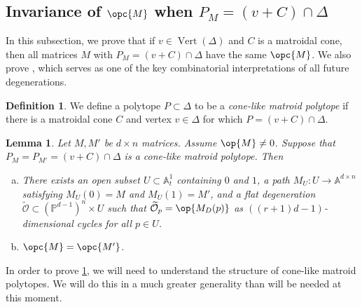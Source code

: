 \documentclass[12pt]{amsart}
\newcommand{\mb}{\mathbb}
\newcommand{\mc}{\mathcal}
\newcommand{\wt}{\widetilde}
\newcommand{\Vt}{{\operatorname{Vert}}}
\theoremstyle{plain}
\newtheorem{Lem}[Thm]{Lemma}
\theoremstyle{definition}
\newtheorem{Def}{Definition}[section]
\theoremstyle{remark}
\begin{document}

\subsection{Invariance of $\opc{M}$ when $P_M=(v+C)\cap \Delta$}
In this subsection, we prove that if $v \in \Vt(\Delta)$ and $C$ is a matroidal cone, then all matrices $M$ with $P_M=(v+C)\cap \Delta$ have the same $\opc{M}$. We also prove , which serves as one of the key combinatorial interpretations of all future degenerations.

\begin{Def}
\label{conelike}
We define a polytope $P \subset \Delta$ to be a \emph{cone-like matroid polytope} if there is a matroidal cone $C$ and vertex $v \in \Delta$ for which $P=(v+C)\cap \Delta$. 
\end{Def}

\begin{Lem} \label{matroidconelemma}
Let $M, M'$ be $d \times n$ matrices. Assume $\op{M}\neq 0$. Suppose that $P_{M} = P_{M'} = (v + C) \cap \Delta$ is a cone-like matroid polytope. Then 
\begin{enumerate}[(a)]
	\item There exists an open subset $U \subset \mb{A}^1_t$ containing $0$ and $1$, a path $M_U : U \to \mb{A}^{d \times n}$ satisfying $M_U(0) = M$ and $M_U(1) = M'$, and a flat degeneration $\wt{\mc{O}} \subset (\mathbb{P}^{d-1})^n \times U$ such that $\wt{\mc{O}}_{p} = \op{M_D(p)}$ as $((r+1)d-1)$-dimensional cycles for all $p \in U$.
	\item $\opc{M}=\opc{M'}$.
\end{enumerate}
\end{Lem}

In order to prove \cref{matroidconelemma}, we will need to understand the structure of cone-like matroid polytopes. We will do this in a much greater generality than will be needed at this moment.
\end{document}
